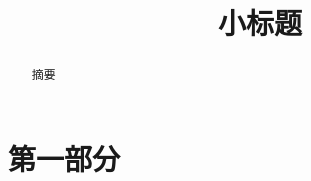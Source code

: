 \documentclass[12pt,hyperref,a4paper,UTF8]{ctexart}
\begin{document}
\cover
\thispagestyle{empty} %



\newpage
\begin{abstract}

摘要

\end{abstract}

\vspace{1cm}

\tableofcontents

\newpage

\begin{center}
   \title{ \Huge \textbf{{小标题}}}
\end{center}

\section{第一部分}


\end{document}
